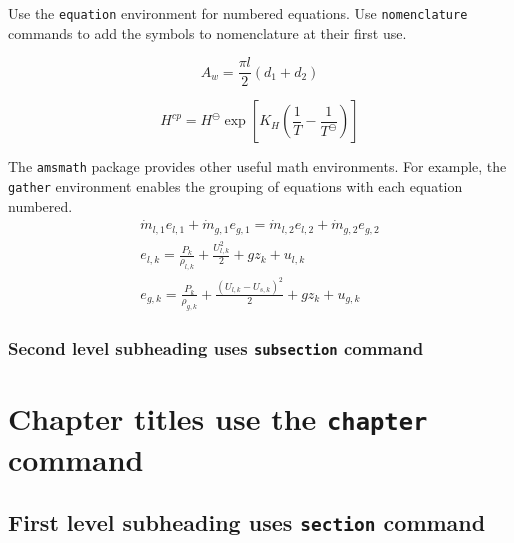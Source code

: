 \documentclass[openany, 12pt]{book}
\begin{document}
{{Use the \texttt{equation} environment for numbered equations.
Use \texttt{nomenclature} commands to add the symbols to nomenclature at their first use.

\begin{equation}
    A_w = \frac{\pi l}{2}\left(d_1 + d_2\right)
\end{equation}


\begin{equation}
    H^{cp} = H^\ominus \exp\left[K_H\left(\frac{1}{T}-\frac{1}{T^\ominus}\right)\right]
\end{equation}


The \texttt{amsmath} package provides other useful math environments.
For example, the \texttt{gather} environment enables the grouping of equations with each equation numbered.
\begin{gather}
    \dot{m}_{l,1}e_{l,1} + \dot{m}_{g,1}e_{g,1} = \dot{m}_{l,2}e_{l,2} + \dot{m}_{g,2}e_{g,2} \label{eq:energy-conservation} \\
    e_{l,k} = \frac{P_k}{\rho_{l,k}} + \frac{U^2_{l,k}}{2} + gz_k + u_{l,k} \label{eq:liquid-energy} \\
    e_{g,k} = \frac{P_k}{\rho_{g,k}} + \frac{\left(U_{l,k}-U_{s,k}\right)^2}{2} + gz_k + u_{g,k} \label{eq:gas-energy}
\end{gather}

\subsection{Second level subheading uses \texttt{subsection} command}

\chapter{Chapter titles use the \texttt{chapter} command}

\section{First level subheading uses \texttt{section} command}

}}
\end{document}
